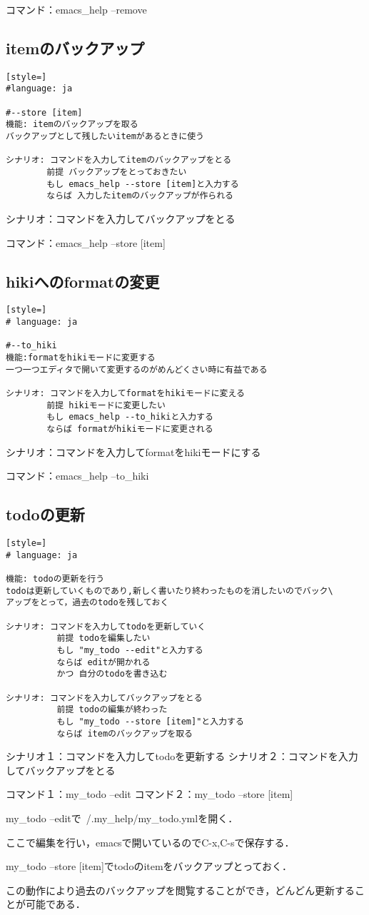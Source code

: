 コマンド：emacs\_help --remove

\subsection{itemのバックアップ}\begin{lstlisting}[style=]
#language: ja

#--store [item]
機能: itemのバックアップを取る
バックアップとして残したいitemがあるときに使う

シナリオ: コマンドを入力してitemのバックアップをとる
        前提 バックアップをとっておきたい
        もし emacs_help --store [item]と入力する
        ならば 入力したitemのバックアップが作られる
\end{lstlisting}
シナリオ：コマンドを入力してバックアップをとる

コマンド：emacs\_help --store [item]

\subsection{hikiへのformatの変更}\begin{lstlisting}[style=]
# language: ja

#--to_hiki
機能:formatをhikiモードに変更する
一つ一つエディタで開いて変更するのがめんどくさい時に有益である

シナリオ: コマンドを入力してformatをhikiモードに変える
        前提 hikiモードに変更したい
        もし emacs_help --to_hikiと入力する
        ならば formatがhikiモードに変更される
\end{lstlisting}
シナリオ：コマンドを入力してformatをhikiモードにする

コマンド：emacs\_help --to\_hiki

\subsection{todoの更新}\begin{lstlisting}[style=]
# language: ja

機能: todoの更新を行う
todoは更新していくものであり,新しく書いたり終わったものを消したいのでバック\
アップをとって，過去のtodoを残しておく

シナリオ: コマンドを入力してtodoを更新していく
          前提 todoを編集したい
          もし "my_todo --edit"と入力する
          ならば editが開かれる
          かつ 自分のtodoを書き込む

シナリオ: コマンドを入力してバックアップをとる
          前提 todoの編集が終わった
          もし "my_todo --store [item]"と入力する
          ならば itemのバックアップを取る
\end{lstlisting}
シナリオ１：コマンドを入力してtodoを更新する
シナリオ２：コマンドを入力してバックアップをとる

コマンド１：my\_todo --edit
コマンド２：my\_todo --store [item]

my\_todo --editで~/.my\_help/my\_todo.ymlを開く．

ここで編集を行い，emacsで開いているのでC-x,C-sで保存する．

my\_todo --store [item]でtodoのitemをバックアップとっておく．

この動作により過去のバックアップを閲覧することができ，どんどん更新することが可能である．

